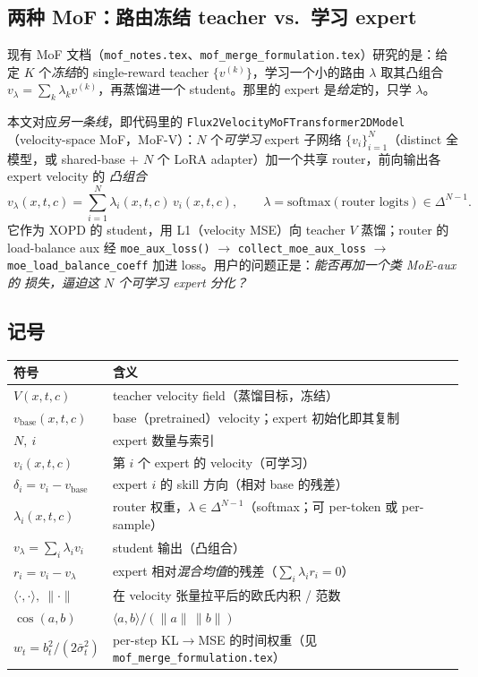 \documentclass[11pt,a4paper]{article}
\newcommand{\base}{\mathrm{base}}
\newcommand{\vbase}{v_{\base}}
\newcommand{\softmax}{\mathrm{softmax}}
\theoremstyle{definition}
\begin{document}
\subsection{两种 MoF：路由冻结 teacher vs.\ 学习 expert}

现有 MoF 文档（\texttt{mof\_notes.tex}、\texttt{mof\_merge\_formulation.tex}）研究的是：给定
$K$ 个\emph{冻结}的 single-reward teacher $\{v^{(k)}\}$，学习一个小的路由 $\lambda$ 取其凸组合
$v_\lambda=\sum_k\lambda_k v^{(k)}$，再蒸馏进一个 student。那里的 expert 是\emph{给定}的，只学
$\lambda$。

本文对应\emph{另一条线}，即代码里的 \texttt{Flux2VelocityMoFTransformer2DModel}（velocity-space
MoF，MoF-V）：$N$ 个\emph{可学习} expert 子网络 $\{v_i\}_{i=1}^N$（distinct 全模型，或
shared-base $+$ $N$ 个 LoRA adapter）加一个共享 router，前向输出各 expert velocity 的
\emph{凸组合}
\begin{equation}
v_\lambda(x,t,c)=\sum_{i=1}^N \lambda_i(x,t,c)\,v_i(x,t,c),\qquad
\lambda=\softmax(\text{router logits})\in\Delta^{N-1}.
\label{eq:mofv}
\end{equation}
它作为 XOPD 的 student，用 L1（velocity MSE）向 teacher $V$ 蒸馏；router 的 load-balance aux 经
\texttt{moe\_aux\_loss()} $\to$ \texttt{collect\_moe\_aux\_loss} $\to$
\texttt{moe\_load\_balance\_coeff} 加进 loss。用户的问题正是：\emph{能否再加一个类 MoE-aux 的
损失，逼迫这 $N$ 个可学习 expert 分化？}

\subsection{记号}
\label{ssec:notation}

\begin{center}
\renewcommand{\arraystretch}{1.2}
\footnotesize
\begin{tabular}{@{}l@{\quad}p{11cm}@{}}
\toprule
\textbf{符号} & \textbf{含义} \\
\midrule
$V(x,t,c)$ & teacher velocity field（蒸馏目标，冻结） \\
$\vbase(x,t,c)$ & base（pretrained）velocity；expert 初始化即其复制 \\
$N,\ i$ & expert 数量与索引 \\
$v_i(x,t,c)$ & 第 $i$ 个 expert 的 velocity（可学习） \\
$\delta_i=v_i-\vbase$ & expert $i$ 的 skill 方向（相对 base 的残差） \\
$\lambda_i(x,t,c)$ & router 权重，$\lambda\in\Delta^{N-1}$（softmax；可 per-token 或 per-sample） \\
$v_\lambda=\sum_i\lambda_i v_i$ & student 输出（凸组合） \\
$r_i=v_i-v_\lambda$ & expert 相对\emph{混合均值}的残差（$\sum_i\lambda_i r_i=0$） \\
$\langle\cdot,\cdot\rangle,\ \|\cdot\|$ & 在 velocity 张量拉平后的欧氏内积 / 范数 \\
$\cos(a,b)$ & $\langle a,b\rangle/(\|a\|\,\|b\|)$ \\
$w_t=b_t^2/(2\bar\sigma_t^2)$ & per-step KL$\to$MSE 的时间权重（见 \texttt{mof\_merge\_formulation.tex}） \\
\bottomrule
\end{tabular}
\end{center}
\end{document}
